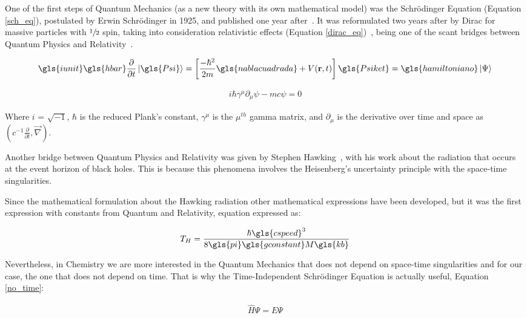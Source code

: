 One of the first steps of Quantum Mechanics (as a new theory with its own
mathematical model) was the Schrödinger Equation (Equation \ref{sch_eq}),
postulated by Erwin Schrödinger in 1925, and published one year
after~\citet{Schrdinger1926}. It was reformulated two years after by Dirac for
massive particles with $\sfrac{1}{2}$ spin, taking into consideration
relativistic effects (Equation \ref{dirac_eq})~\citep{Dirac1928}, being one of
the scant bridges between Quantum Physics and Relativity~\cite{Halzen1984}.

\begin{equation}
  \gls{iunit}\gls{hbar}\frac{\partial}{\partial t}\ket{\gls{Psi}} = \left [ \frac{-\hbar^2}{2m}\gls{nablacuadrada}
  + V(\mathbf{r},t) \right ] \gls{Psiket} = \gls{hamiltoniano}\ket{\Psi}
  \label{sch_eq}
\end{equation}

\begin{align}
  i\hbar\gamma^{\mu}\partial_{\mu}\psi - mc\psi = 0
  \label{dirac_eq}
\end{align}

Where $i$ = $\sqrt{-1}$, $\hbar$ is the reduced Plank's constant,
$\gamma^{\mu}$ is the $\mu^{th}$ gamma matrix, and $\partial_{\mu}$ is the
derivative over time and space as $\left( c^{-1}\frac{\partial}{\partial t},
\vec{\nabla} \right)$.

Another bridge between Quantum Physics and Relativity was given by Stephen
Hawking~\cite{HAWKING1974}, with his work about the radiation that occurs at
the event horizon of black holes. This is because this phenomena involves the
Heisenberg's uncertainty principle with the space-time singularities. 

Since the mathematical formulation about the Hawking radiation other
mathematical expressions have been developed, but it was the first expression
with constants from Quantum and Relativity, equation expressed as:

\begin{align}
  T_{H} = \frac{\hbar \gls{cspeed}^{3}}{8\gls{pi} \gls{gconstant}M \gls{kb}}
\end{align}

Nevertheless, in Chemistry we are more interested in the Quantum Mechanics that
does not depend on space-time singularities and for our case, the one that does
not depend on time.  That is why the Time-Independent Schrödinger Equation is
actually useful, Equation \ref{no_time}:

\begin{align}
  \widehat{H}\Psi = E\Psi 
  \label{no_time}
\end{align}

